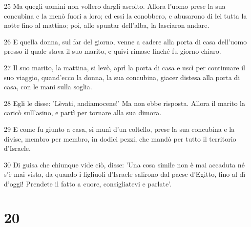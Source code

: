 \par 25 Ma quegli uomini non vollero dargli ascolto. Allora l'uomo prese la sua concubina e la menò fuori a loro; ed essi la conobbero, e abusarono di lei tutta la notte fino al mattino; poi, allo spuntar dell'alba, la lasciaron andare.
\par 26 E quella donna, sul far del giorno, venne a cadere alla porta di casa dell'uomo presso il quale stava il suo marito, e quivi rimase finché fu giorno chiaro.
\par 27 Il suo marito, la mattina, si levò, aprì la porta di casa e uscì per continuare il suo viaggio, quand'ecco la donna, la sua concubina, giacer distesa alla porta di casa, con le mani sulla soglia.
\par 28 Egli le disse: 'Lèvati, andiamocene!' Ma non ebbe risposta. Allora il marito la caricò sull'asino, e partì per tornare alla sua dimora.
\par 29 E come fu giunto a casa, si munì d'un coltello, prese la sua concubina e la divise, membro per membro, in dodici pezzi, che mandò per tutto il territorio d'Israele.
\par 30 Di guisa che chiunque vide ciò, disse: 'Una cosa simile non è mai accaduta né s'è mai vista, da quando i figliuoli d'Israele salirono dal paese d'Egitto, fino al dì d'oggi! Prendete il fatto a cuore, consigliatevi e parlate'.

\chapter{20}

